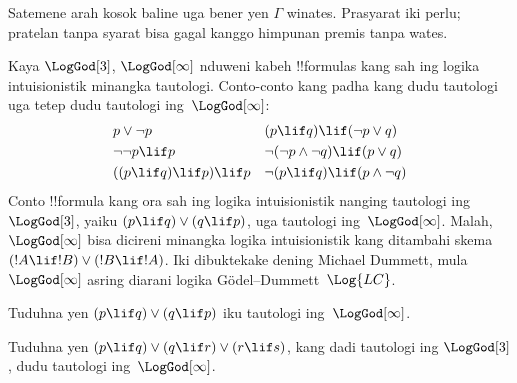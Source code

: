 \documentclass[../../../include/open-logic-section]{subfiles}
\begin{document}
Satemene arah kosok baline uga bener yen $\Gamma$ winates. Prasyarat iki perlu; pratelan tanpa syarat bisa gagal kanggo himpunan premis tanpa wates.

Kaya $\LogGod[3]$, $\LogGod[\infty]$ nduweni kabeh
!!{formula}s kang sah ing logika intuisionistik minangka tautologi.
Conto-conto kang padha kang dudu tautologi uga tetep dudu tautologi
ing~$\LogGod[\infty]$:
\begin{align*}
  & p \lor \lnot p && (p \lif q) \lif (\lnot p \lor q) \\
  & \lnot\lnot p \lif p && \lnot(\lnot p \land \lnot q) \lif (p \lor q) \\
  & ((p \lif q) \lif p) \lif p && \lnot(p \lif q) \lif (p \land \lnot q)
\end{align*}
Conto !!{formula} kang ora sah ing logika intuisionistik nanging
tautologi ing~$\LogGod[3]$, yaiku $(p \lif q) \lor (q \lif
p)$, uga tautologi ing~$\LogGod[\infty]$. Malah,
$\LogGod[\infty]$ bisa dicireni minangka logika intuisionistik
kang ditambahi skema $(!A \lif !B) \lor (!B \lif !A)$.
Iki dibuktekake dening Michael Dummett, mula $\LogGod[\infty]$
asring diarani logika G\"odel--Dummett~$\Log{LC}$.

\begin{prob}
  Tuduhna yen $(p \lif q) \lor (q \lif p)$ iku tautologi
  ing~$\LogGod[\infty]$.
\end{prob}

\begin{prob}
  Tuduhna yen $(p \lif q) \lor (q \lif r) \lor (r \lif s)$,
  kang dadi tautologi ing $\LogGod[3]$, dudu tautologi
  ing~$\LogGod[\infty]$.
\end{prob}
\end{document}
